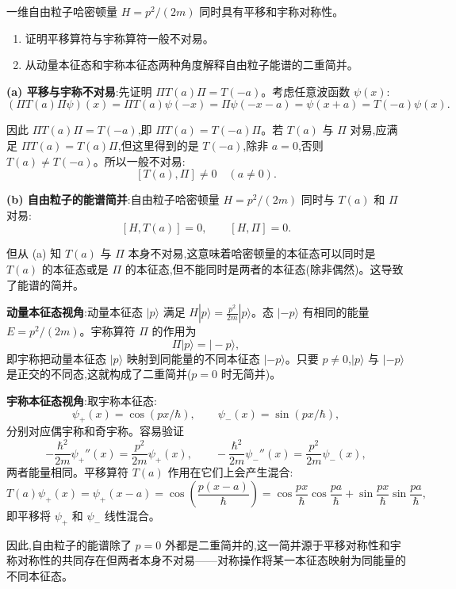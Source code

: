 \begin{question}
一维自由粒子哈密顿量 $H=p^2/(2m)$ 同时具有平移和宇称对称性。
\begin{enumerate}
\item 证明平移算符与宇称算符一般不对易。
\item 从动量本征态和宇称本征态两种角度解释自由粒子能谱的二重简并。
\end{enumerate}
\begin{solution}
	\textbf{(a) 平移与宇称不对易}:先证明 $\Pi T(a)\Pi = T(-a)$。考虑任意波函数 $\psi(x)$:
	\[
	(\Pi T(a)\Pi\psi)(x) = \Pi T(a)\psi(-x) = \Pi\psi(-x-a) = \psi(x+a) = T(-a)\psi(x).
	\]

	因此 $\Pi T(a)\Pi = T(-a)$,即 $\Pi T(a) = T(-a)\Pi$。若 $T(a)$ 与 $\Pi$ 对易,应满足 $\Pi T(a) = T(a)\Pi$,但这里得到的是 $T(-a)$,除非 $a=0$,否则 $T(a)\neq T(-a)$。所以一般不对易:
	\[
	\boxed{[T(a),\Pi]\neq0\quad (a\neq0)}.
	\]

	\textbf{(b) 自由粒子的能谱简并}:自由粒子哈密顿量 $H=p^2/(2m)$ 同时与 $T(a)$ 和 $\Pi$ 对易:
	\[
	[H,T(a)]=0,\qquad [H,\Pi]=0.
	\]

	但从 (a) 知 $T(a)$ 与 $\Pi$ 本身不对易,这意味着哈密顿量的本征态可以同时是 $T(a)$ 的本征态或是 $\Pi$ 的本征态,但不能同时是两者的本征态(除非偶然)。这导致了能谱的简并。

	\textbf{动量本征态视角}:动量本征态 $|p\rangle$ 满足 $H|p\rangle=\frac{p^2}{2m}|p\rangle$。态 $|-p\rangle$ 有相同的能量 $E=p^2/(2m)$。宇称算符 $\Pi$ 的作用为
	\[
	\Pi|p\rangle = |-p\rangle,
	\]
	即宇称把动量本征态 $|p\rangle$ 映射到同能量的不同本征态 $|-p\rangle$。只要 $p\neq0$,$|p\rangle$ 与 $|-p\rangle$ 是正交的不同态,这就构成了二重简并($p=0$ 时无简并)。

	\textbf{宇称本征态视角}:取宇称本征态:
	\[
	\psi_+(x)=\cos(px/\hbar),\qquad \psi_-(x)=\sin(px/\hbar),
	\]
	分别对应偶宇称和奇宇称。容易验证
	\[
	-\frac{\hbar^2}{2m}\psi_+''(x)=\frac{p^2}{2m}\psi_+(x),\qquad
	-\frac{\hbar^2}{2m}\psi_-''(x)=\frac{p^2}{2m}\psi_-(x),
	\]
	两者能量相同。平移算符 $T(a)$ 作用在它们上会产生混合:
	\[
	T(a)\psi_+(x)=\psi_+(x-a)=\cos\left(\frac{p(x-a)}{\hbar}\right)
	=\cos\frac{px}{\hbar}\cos\frac{pa}{\hbar}+\sin\frac{px}{\hbar}\sin\frac{pa}{\hbar},
	\]
	即平移将 $\psi_+$ 和 $\psi_-$ 线性混合。

	因此,自由粒子的能谱除了 $p=0$ 外都是二重简并的,这一简并源于平移对称性和宇称对称性的共同存在但两者本身不对易——对称操作将某一本征态映射为同能量的不同本征态。
	\end{solution}
\end{question}


